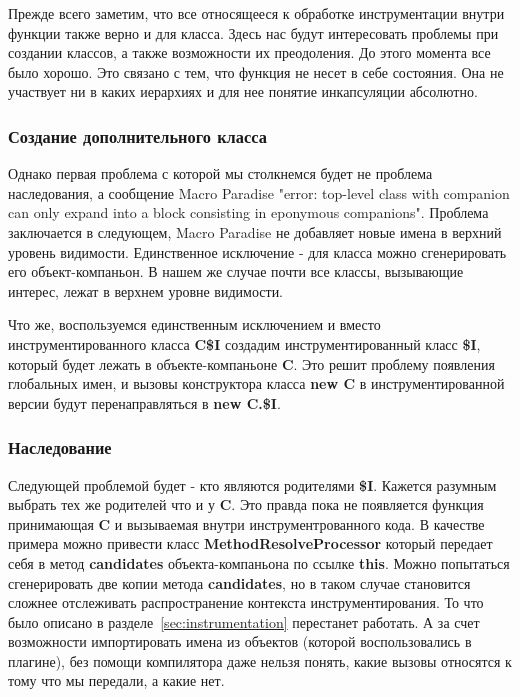 Прежде всего заметим, что все относящееся к обработке инструментации внутри
функции также верно и для класса.
Здесь нас будут интересовать проблемы при создании классов, а также возможности
их преодоления.
До этого момента все было хорошо.
Это связано с тем, что функция не несет в себе состояния.
Она не участвует ни в каких иерархиях и для нее понятие инкапсуляции абсолютно.

\subsubsection{Создание дополнительного класса}

Однако первая проблема с которой мы столкнемся будет не проблема наследования,
а сообщение Macro Paradise
"error: top-level class with companion can only expand into a block consisting
in eponymous companions".
Проблема заключается в следующем, Macro Paradise не добавляет новые имена в
верхний уровень видимости.
Единственное исключение - для класса можно сгенерировать его объект-компаньон.
В нашем же случае почти все классы, вызывающие интерес, лежат в верхнем уровне
видимости.

Что же, воспользуемся единственным исключением и вместо инструментированного
класса \textbf{C\$I} создадим инструментированный класс \textbf{\$I}, который
будет лежать в объекте-компаньоне \textbf{C}.
Это решит проблему появления глобальных имен, и вызовы конструктора класса
\textbf{new C} в инструментированной версии будут перенаправляться
в \textbf{new C.\$I}.

\subsubsection{Наследование}

Следующей проблемой будет - кто являются родителями \textbf{\$I}.
Кажется разумным выбрать тех же родителей что и у \textbf{C}.
Это правда пока не появляется функция принимающая \textbf{C} и вызываемая
внутри инструментрованного кода.
В качестве примера можно привести класс \textbf{MethodResolveProcessor}
который передает себя в метод \textbf{candidates} объекта-компаньона
по ссылке \textbf{this}.
Можно попытаться сгенерировать две копии метода \textbf{candidates},
но в таком случае становится сложнее отслеживать распространение контекста
инструментирования.
То что было описано в разделе~\ref{sec:instrumentation} перестанет работать.
А за счет возможности импортировать имена из объектов (которой воспользовались
в плагине), без помощи компилятора даже нельзя понять, какие вызовы относятся
к тому что мы передали, а какие нет.

